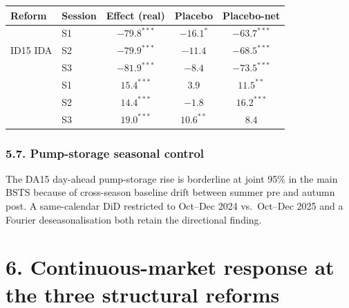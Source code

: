 \documentclass[11pt]{article}
\begin{document}
\begin{center}
\footnotesize
\setlength{\tabcolsep}{6pt}
\begin{tabular}{l l c c c}
\toprule
\textbf{Reform} & \textbf{Session} & \textbf{Effect (real)} & \textbf{Placebo} & \textbf{Placebo-net} \\
\midrule
\multirow{3}{*}{ID15 IDA} & S1 & $-79.8^{***}$ & $-16.1^{*}$ & $-63.7^{***}$ \\
                          & S2 & $-79.9^{***}$ & $-11.4$      & $-68.5^{***}$ \\
                          & S3 & $-81.9^{***}$ & $-8.4$       & $-73.5^{***}$ \\
\addlinespace
\multirow{3}{*}{DA15 IDA} & S1 & $15.4^{***}$  & $3.9$        & $11.5^{**}$   \\
                          & S2 & $14.4^{***}$  & $-1.8$       & $16.2^{***}$  \\
                          & S3 & $19.0^{***}$  & $10.6^{**}$  & $8.4$         \\
\bottomrule
\end{tabular}
\label{tab:bsts-per-session}
\end{center}

\subsubsection*{5.7. Pump-storage seasonal control}\label{sec:5c-prime}
The DA15 day-ahead pump-storage rise is borderline at joint 95\% in the main BSTS because of cross-season baseline drift between summer pre and autumn post. A same-calendar DiD restricted to Oct--Dec 2024 vs.\ Oct--Dec 2025 and a Fourier deseasonalisation both retain the directional finding.

\section*{6. Continuous-market response at the three structural reforms}
\label{sec:continuous}
\end{document}
